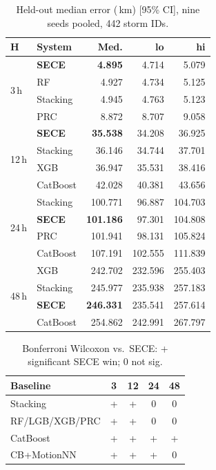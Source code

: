 \documentclass[conference]{IEEEtran}
\newcommand{\sece}{SECE}
\newcommand{\km}{\,km}
\begin{document}
\begin{table}[t]
\caption{Held-out median error (\km{}) [95\% CI], nine seeds pooled, 442 storm IDs.}
\label{tab:held}
\centering
\scriptsize
\setlength{\tabcolsep}{2.5pt}
\begin{tabular}{@{}llrrr@{}}
\toprule
H & System & Med. & lo & hi \\
\midrule
\multirow{4}{*}{3\,h}
& \textbf{\sece{}} & \textbf{4.895} & 4.714 & 5.079 \\
& RF & 4.927 & 4.734 & 5.125 \\
& Stacking & 4.945 & 4.763 & 5.123 \\
& PRC & 8.872 & 8.707 & 9.058 \\
\midrule
\multirow{4}{*}{12\,h}
& \textbf{\sece{}} & \textbf{35.538} & 34.208 & 36.925 \\
& Stacking & 36.146 & 34.744 & 37.701 \\
& XGB & 36.947 & 35.531 & 38.416 \\
& CatBoost & 42.028 & 40.381 & 43.656 \\
\midrule
\multirow{4}{*}{24\,h}
& Stacking & 100.771 & 96.887 & 104.703 \\
& \textbf{\sece{}} & \textbf{101.186} & 97.301 & 104.808 \\
& PRC & 101.941 & 98.131 & 105.824 \\
& CatBoost & 107.191 & 102.555 & 111.839 \\
\midrule
\multirow{4}{*}{48\,h}
& XGB & 242.702 & 232.596 & 255.403 \\
& Stacking & 245.977 & 235.938 & 257.183 \\
& \textbf{\sece{}} & \textbf{246.331} & 235.541 & 257.614 \\
& CatBoost & 254.862 & 242.991 & 267.797 \\
\bottomrule
\end{tabular}
\end{table}

\begin{table}[t]
\caption{Bonferroni Wilcoxon vs.\ \sece{}: + significant SECE win; 0 not sig.}
\label{tab:sig}
\centering
\scriptsize
\begin{tabular}{@{}lcccc@{}}
\toprule
Baseline & 3 & 12 & 24 & 48 \\
\midrule
Stacking & + & + & 0 & 0 \\
RF/LGB/XGB/PRC & + & + & 0 & 0 \\
CatBoost & + & + & + & + \\
CB+MotionNN & + & + & + & 0 \\
\bottomrule
\end{tabular}
\end{table}
\end{document}
